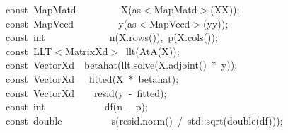 \documentclass[shortnames,article]{jss}
\newcommand{\hlstd}[1]{\textcolor[rgb]{0,0,0}{#1}}
\newcommand{\hlopt}[1]{\textcolor[rgb]{0,0,0}{#1}}
\newcommand{\hlkwb}[1]{\textcolor[rgb]{0.13,0.54,0.13}{#1}}
\newcommand{\hlkwd}[1]{\textcolor[rgb]{0,0,0}{#1}}
\begin{document}
\begin{figure}[tbh]
  \noindent
  \ttfamily
  \hlstd{}\hlkwb{const\ }\hlstd{MapMatd}\hlstd{\ \ \ \ \ \ \ \ \ }\hlstd{}\hlkwd{X}\hlstd{}\hlopt{(}\hlstd{as}\hlopt{$<$}\hlstd{MapMatd}\hlopt{$>$(}\hlstd{XX}\hlopt{));}\hspace*{\fill}\\
  \hlstd{}\hlkwb{const\ }\hlstd{MapVecd}\hlstd{\ \ \ \ \ \ \ \ \ }\hlstd{}\hlkwd{y}\hlstd{}\hlopt{(}\hlstd{as}\hlopt{$<$}\hlstd{MapVecd}\hlopt{$>$(}\hlstd{yy}\hlopt{));}\hspace*{\fill}\\
  \hlstd{}\hlkwb{const\ int}\hlstd{\ \ \ \ \ \ \ \ \ \ \ \ \ }\hlkwb{}\hlstd{}\hlkwd{n}\hlstd{}\hlopt{(}\hlstd{X}\hlopt{.}\hlstd{}\hlkwd{rows}\hlstd{}\hlopt{()),\ }\hlstd{}\hlkwd{p}\hlstd{}\hlopt{(}\hlstd{X}\hlopt{.}\hlstd{}\hlkwd{cols}\hlstd{}\hlopt{());}\hspace*{\fill}\\
  \hlstd{}\hlkwb{const\ }\hlstd{LLT}\hlopt{$<$}\hlstd{MatrixXd}\hlopt{$>$\ }\hlstd{}\hlkwd{llt}\hlstd{}\hlopt{(}\hlstd{}\hlkwd{AtA}\hlstd{}\hlopt{(}\hlstd{X}\hlopt{));}\hspace*{\fill}\\
  \hlstd{}\hlkwb{const\ }\hlstd{VectorXd}\hlstd{\ \ }\hlstd{}\hlkwd{betahat}\hlstd{}\hlopt{(}\hlstd{llt}\hlopt{.}\hlstd{}\hlkwd{solve}\hlstd{}\hlopt{(}\hlstd{X}\hlopt{.}\hlstd{}\hlkwd{adjoint}\hlstd{}\hlopt{()\ {*}\ }\hlstd{y}\hlopt{));}\hspace*{\fill}\\
  \hlstd{}\hlkwb{const\ }\hlstd{VectorXd}\hlstd{\ \ \ }\hlstd{}\hlkwd{fitted}\hlstd{}\hlopt{(}\hlstd{X\ }\hlopt{{*}\ }\hlstd{betahat}\hlopt{);}\hspace*{\fill}\\
  \hlstd{}\hlkwb{const\ }\hlstd{VectorXd}\hlstd{\ \ \ \ }\hlstd{}\hlkwd{resid}\hlstd{}\hlopt{(}\hlstd{y\ }\hlopt{{-}\ }\hlstd{fitted}\hlopt{);}\hspace*{\fill}\\
  \hlstd{}\hlkwb{const\ int}\hlstd{\ \ \ \ \ \ \ \ \ \ \ \ }\hlkwb{}\hlstd{}\hlkwd{df}\hlstd{}\hlopt{(}\hlstd{n\ }\hlopt{{-}\ }\hlstd{p}\hlopt{);}\hspace*{\fill}\\
  \hlstd{}\hlkwb{const\ double}\hlstd{\ \ \ \ \ \ \ \ \ \ }\hlkwb{}\hlstd{}\hlkwd{s}\hlstd{}\hlopt{(}\hlstd{resid}\hlopt{.}\hlstd{}\hlkwd{norm}\hlstd{}\hlopt{()\ /\ }\hlstd{std}\hlopt{::}\hlstd{}\hlkwd{sqrt}\hlstd{}\hlopt{(}\hlstd{}\hlkwb{double}\hlstd{}\hlopt{(}\hlstd{df}\hlopt{)));}\hspace*{\fill}\\

\end{figure}
\end{document}
